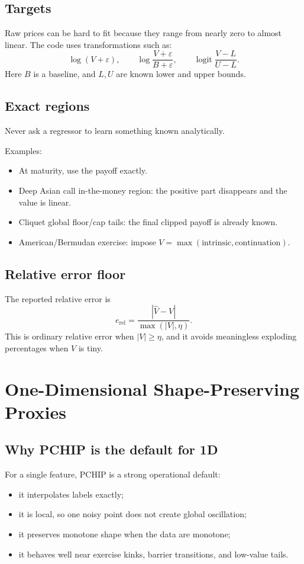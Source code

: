 \documentclass[11pt,oneside]{book}
\theoremstyle{definition}
\begin{document}
\section{Targets}
Raw prices can be hard to fit because they range from nearly zero to almost linear. The code uses transformations such as:
\[
  \log(V+\varepsilon),\qquad
  \log\frac{V+\varepsilon}{B+\varepsilon},\qquad
  \operatorname{logit}\frac{V-L}{U-L}.
\]
Here \(B\) is a baseline, and \(L,U\) are known lower and upper bounds.

\section{Exact regions}
Never ask a regressor to learn something known analytically.

Examples:
\begin{itemize}
  \item At maturity, use the payoff exactly.
  \item Deep Asian call in-the-money region: the positive part disappears and the value is linear.
  \item Cliquet global floor/cap tails: the final clipped payoff is already known.
  \item American/Bermudan exercise: impose \(V=\max(\text{intrinsic},\text{continuation})\).
\end{itemize}

\section{Relative error floor}
The reported relative error is
\[
  e_{\mathrm{rel}}
  =
  \frac{|\widehat V-V|}{\max(|V|,\eta)}.
\]
This is ordinary relative error when \(|V|\ge \eta\), and it avoids meaningless exploding percentages when \(V\) is tiny.

\chapter{One-Dimensional Shape-Preserving Proxies}

\section{Why PCHIP is the default for 1D}
For a single feature, PCHIP is a strong operational default:
\begin{itemize}
  \item it interpolates labels exactly;
  \item it is local, so one noisy point does not create global oscillation;
  \item it preserves monotone shape when the data are monotone;
  \item it behaves well near exercise kinks, barrier transitions, and low-value tails.
\end{itemize}
\end{document}
